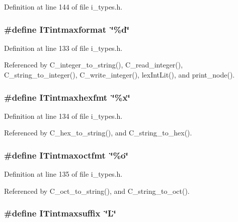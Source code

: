 Definition at line 144 of file i\_\-types.h.
\subsubsection{\setlength{\rightskip}{0pt plus 5cm}\#define ITintmaxformat~\char`\"{}\%d\char`\"{}}\label{i__types_8h_51f7067c5d8d6beb606b9eac6e9c6231}




Definition at line 133 of file i\_\-types.h.

Referenced by C\_\-integer\_\-to\_\-string(), C\_\-read\_\-integer(), C\_\-string\_\-to\_\-integer(), C\_\-write\_\-integer(), lex\-Int\-Lit(), and print\_\-node().
\subsubsection{\setlength{\rightskip}{0pt plus 5cm}\#define ITintmaxhexfmt~\char`\"{}\%x\char`\"{}}\label{i__types_8h_474bf363e946ed57a0fe812dec52a64c}




Definition at line 134 of file i\_\-types.h.

Referenced by C\_\-hex\_\-to\_\-string(), and C\_\-string\_\-to\_\-hex().
\subsubsection{\setlength{\rightskip}{0pt plus 5cm}\#define ITintmaxoctfmt~\char`\"{}\%o\char`\"{}}\label{i__types_8h_41dde9dec4ad572ff0034ed2cc813b0c}




Definition at line 135 of file i\_\-types.h.

Referenced by C\_\-oct\_\-to\_\-string(), and C\_\-string\_\-to\_\-oct().
\subsubsection{\setlength{\rightskip}{0pt plus 5cm}\#define ITintmaxsuffix~\char`\"{}L\char`\"{}}\label{i__types_8h_c82b9d4c75c39d6519d9036490037fa0}




